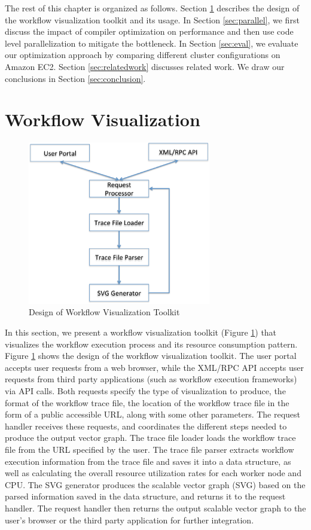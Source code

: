 The rest of this chapter is organized as follows. Section \ref{v1_sec:visualization} describes the design of the workflow visualization toolkit and its usage. In Section \ref{sec:parallel}, we first discuss the impact of compiler optimization on performance and then use code level parallelization to mitigate the bottleneck. In Section \ref{sec:eval}, we evaluate our optimization approach by comparing different cluster configurations on Amazon EC2. Section \ref{sec:relatedwork} discusses related work. We draw our conclusions in Section \ref{sec:conclusion}.

\section{Workflow Visualization}
\label{v1_sec:visualization}

\begin{figure}[t!]
\centering
\includegraphics[width=8cm]{toolkit}
\caption{Design of Workflow Visualization Toolkit}
	\label{fig:toolkit}
\end{figure}



In this section, we present a workflow visualization toolkit (Figure \ref{fig:toolkit}) that visualizes the workflow execution process and its resource consumption pattern. Figure \ref{fig:toolkit} shows the design of the workflow visualization toolkit. The user portal accepts user requests from a web browser, while the XML/RPC API accepts user requests from third party applications (such as workflow execution frameworks) via API calls. Both requests specify the type of visualization to produce, the format of the workflow trace file, the location of the workflow trace file in the form of a public accessible URL, along with some other parameters. The request handler receives these requests, and coordinates the different steps needed to produce the output vector graph. The trace file loader loads the workflow trace file from the URL specified by the user. The trace file parser extracts workflow execution information from the trace file and saves it into a data structure, as well as calculating the overall resource utilization rates for each worker node and CPU. The SVG generator produces the scalable vector graph (SVG) based on the parsed information saved in the data structure, and returns it to the request handler. The request handler then returns the output scalable vector graph to the user's browser or the third party application for further integration.


